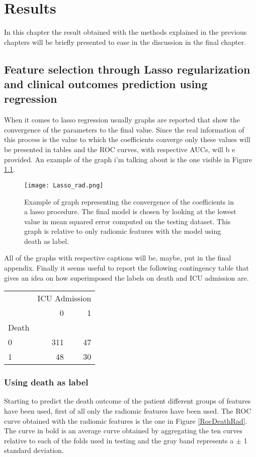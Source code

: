 \chapter{Results}
In this chapter the result obtained with the methods explained in the previous chapters will be briefly presented to ease in the discussion in the final chapter. 

\section{Feature selection through Lasso regularization and clinical outcomes prediction using regression}
When it comes to lasso regression usually graphs are reported that show the convergence of the parameters to the final value. Since the real information of this process is the value to which the coefficients converge only these values will be presented in tables and the ROC curves, with respective AUCs, will b e provided. An example of the graph i'm talking about is the one visible in Figure \ref{LassoParam}.


\begin{figure}[htbp]
  		\texttt{[image: Lasso\_rad.png]}
        \caption{Example of graph representing the convergence of the coefficients in a lasso procedure. The final model is chosen by looking at the lowest value in mean squared error computed on the testing dataset. This graph is relative to only radiomic features with the model using death as label.\label{LassoParam}}
\end{figure}

All of the graphs with respective captions will be, maybe, put in the final appendix.
Finally it seems useful to report the following contingency table that gives an idea on how superimposed the labels on death and ICU admission are.

\begin{tabular}{l|rr}
\toprule
{} & \multicolumn{2}{l}{ICU Admission} \\
 &       0 &   1 \\
Death &         &     \\
\midrule
0     &     311 &  47 \\
1     &      48 &  30 \\
\bottomrule
\end{tabular}

\subsection{Using death as label}
Starting to predict the death outcome of the patient different groups of features have been used, first of all only the radiomic features have been used. The ROC curve obtained with the radiomic features is the one in Figure \ref{RocDeathRad}. The curve in bold is an average curve obtained by aggregating the ten curves relative to each of the folds used in testing and the gray band represents a $\pm$ 1 standard deviation.

